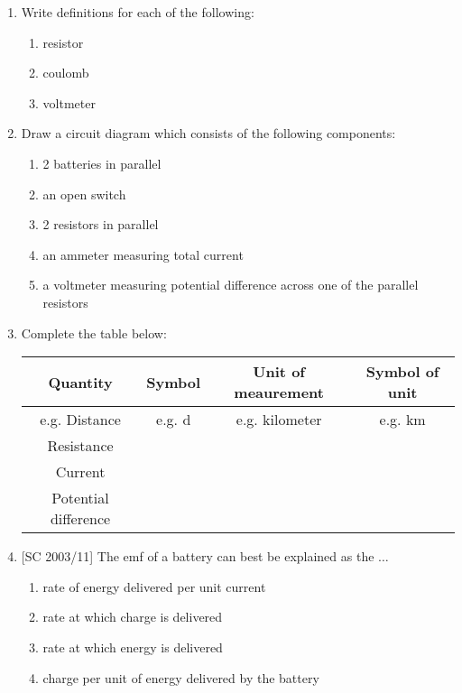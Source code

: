 \begin{enumerate}
\item{ Write definitions for each of the following:
  \begin{enumerate}
  \item resistor
  \item coulomb
  \item voltmeter
  \end{enumerate}}

\item{ Draw a circuit diagram which consists of the following components:
  \begin{enumerate}
  \item 2 batteries in parallel
  \item an open switch
  \item 2 resistors in parallel
  \item an ammeter measuring total current
  \item a voltmeter measuring potential difference across one of the parallel resistors
  \end{enumerate}}

\item{ Complete the table below: \\

\begin{tabular}{ | c | c | c | c| } \hline 
\textbf{Quantity} & \textbf{Symbol} & \textbf{Unit of meaurement} & \textbf{Symbol of unit} \\ \hline \hline 
e.g. Distance & e.g. d & e.g. kilometer & e.g. km \\ \hline 
Resistance &   &   &  \\ \hline
Current  &   &   &  \\ \hline
Potential difference  &   &   &  \\ \hline
\hline
\end{tabular}
}

\item{[SC 2003/11] The emf of a battery can best be explained as the $\dots$
\begin{enumerate}
\item{rate of energy delivered per unit current}
\item{rate at which charge is delivered}
\item{rate at which energy is delivered}
\item{charge per unit of energy delivered by the battery}
\end{enumerate}}


\end{enumerate}
